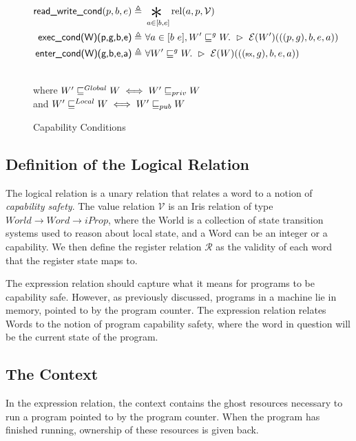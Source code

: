 \documentclass[sigplan,review]{acmart}\settopmatter{printfolios=true,printccs=false,printacmref=false}
\newcommand{\bigsep}{\mathop{\scalebox{2.5}{\raisebox{-0.4ex}{$*$}}}}%
\newcommand{\interp}[2]{(#1)(#2)}
\begin{document}
\begin{figure*}[ht]
	\begin{minipage}{\textwidth}
	\begin{align*}
 		\textsf{read\_write\_cond}(p,b,e) \triangleq&~\bigsep_{a \in [b,e]} \text{rel}(a,p,\mathcal{V})\\
 		\textsf{exec\_cond(W)(p,g,b,e)} \triangleq&~\forall a \in [b~e], W' \sqsubseteq^g W.~\rhd~\mathcal{E}\interp{W'}{((p,g),b,e,a)}\\
 		\textsf{enter\_cond(W)(g,b,e,a)} \triangleq&~\forall W' \sqsubseteq^g W.~\rhd~\mathcal{E}\interp{W}{((\textsf{\tiny{RX}},g),b,e,a)}
	\end{align*}
	\end{minipage}
	\\[2em]
	where $W' \sqsubseteq^{\tiny Global} W \iff W' \sqsubseteq_{priv} W$\\ and 
	$W' \sqsubseteq^{\tiny Local} W \iff W' \sqsubseteq_{pub} W$	
	
	\caption{Capability Conditions}
	\label{fig:condition}
\end{figure*}

\subsection{Definition of the Logical Relation}
The logical relation is a unary relation that relates a word to a notion of \textit{capability safety}. The value relation $\mathcal{V}$ is an Iris relation of type $World \to Word \to iProp$, where the World is a collection of state transition systems used to reason about local state, and a Word can be an integer or a capability. We then define the register relation $\mathcal{R}$ as the validity of each word that the register state maps to. 

The expression relation should capture what it means for programs to be capability safe. However, as previously discussed, programs in a machine lie in memory, pointed to by the program counter. The expression relation relates Words to the notion of program capability safety, where the word in question will be the current state of the program.


\subsection{The Context}
In the expression relation, the \textsf{context} contains the ghost resources necessary to run a program pointed to by the program counter. When the program has finished running, ownership of these resources is given back. 
\end{document}
